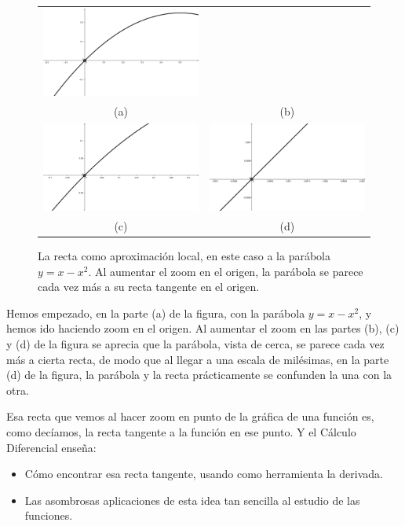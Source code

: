 \begin{figure}[htb]
\begin{center}
\begin{bn}
\begin{tabular}{cc}
\includegraphics[width=6.5cm]{../fig/Cap10-ZoomEnParabola02-bn.png}\\
(a)&(b)\\
\includegraphics[width=6.5cm]{../fig/Cap10-ZoomEnParabola03-bn.png}&
\includegraphics[width=6.5cm]{../fig/Cap10-ZoomEnParabola04-bn.png}\\
(c)&(d)
\end{tabular}
\end{bn}
\caption{La recta como aproximación local, en este caso a la parábola $y=x-x^2$. Al aumentar el zoom en el origen, la parábola se parece cada vez más a su recta tangente en el origen.}
\label{cap10:fig:RectaTangenteParabola}
\end{center}
\end{figure}

Hemos empezado, en la parte (a) de la figura, con la parábola $y=x-x^2$, y hemos ido haciendo zoom en el origen. Al aumentar el zoom en las partes (b), (c) y (d) de la figura se aprecia que la parábola, vista de cerca, se parece cada vez más a cierta recta, de modo que al llegar a una escala de milésimas, en la parte (d) de la figura, la parábola y la recta prácticamente se confunden la una con la otra.

Esa recta que vemos al hacer zoom en punto de la gráfica de una función es, como decíamos, la recta tangente a la función en ese punto. Y el Cálculo Diferencial enseña:
\begin{itemize}
  \item Cómo encontrar esa recta tangente, usando como herramienta la {\sf derivada}.
  \item Las asombrosas aplicaciones de esta idea tan sencilla al estudio de las funciones.
\end{itemize}


